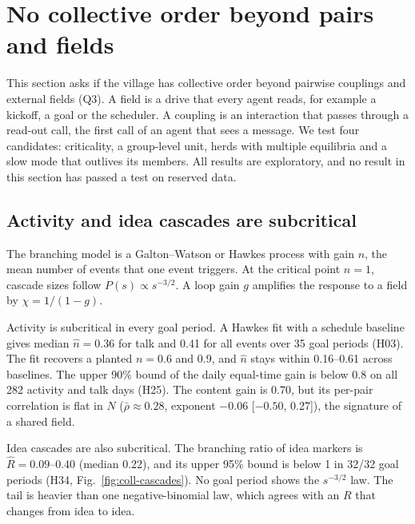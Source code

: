 \section{No collective order beyond pairs and fields}
\label{sec:collective}

This section asks if the village has collective order beyond pairwise couplings and external fields (Q3).
A field is a drive that every agent reads, for example a kickoff, a goal or the scheduler.
A coupling is an interaction that passes through a read-out call, the first call of an agent that sees a message.
We test four candidates: criticality, a group-level unit, herds with multiple equilibria and a slow mode that outlives its members.
All results are exploratory, and no result in this section has passed a test on reserved data.

\subsection{Activity and idea cascades are subcritical}
\label{sec:coll-subcritical}

The branching model is a Galton--Watson or Hawkes process with gain $n$, the mean number of events that one event triggers.
At the critical point $n=1$, cascade sizes follow $P(s)\propto s^{-3/2}$.
A loop gain $g$ amplifies the response to a field by $\chi=1/(1-g)$.

Activity is subcritical in every goal period.
A Hawkes fit with a schedule baseline gives median $\hat n=0.36$ for talk and 0.41 for all events over 35 goal periods (H03).
The fit recovers a planted $n=0.6$ and 0.9, and $\hat n$ stays within 0.16--0.61 across baselines.
The upper 90\% bound of the daily equal-time gain is below 0.8 on all 282 activity and talk days (H25).
The content gain is 0.70, but its per-pair correlation is flat in $N$ ($\bar\rho\approx0.28$, exponent $-0.06$ [$-0.50$, 0.27]), the signature of a shared field.

Idea cascades are also subcritical.
The branching ratio of idea markers is $\hat R=0.09$--0.40 (median 0.22), and its upper 95\% bound is below 1 in 32/32 goal periods (H34, Fig.~\ref{fig:coll-cascades}).
No goal period shows the $s^{-3/2}$ law.
The tail is heavier than one negative-binomial law, which agrees with an $R$ that changes from idea to idea.

